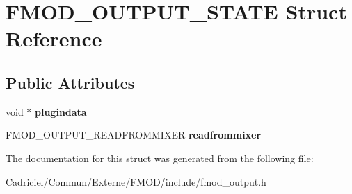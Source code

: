 \hypertarget{struct_f_m_o_d___o_u_t_p_u_t___s_t_a_t_e}{\section{F\-M\-O\-D\-\_\-\-O\-U\-T\-P\-U\-T\-\_\-\-S\-T\-A\-T\-E Struct Reference}
\label{struct_f_m_o_d___o_u_t_p_u_t___s_t_a_t_e}
}
\subsection*{Public Attributes}
\begin{DoxyCompactItemize}
\item 
\hypertarget{struct_f_m_o_d___o_u_t_p_u_t___s_t_a_t_e_a08d52689c8b698c0ea363c7403e8978b}{void $\ast$ {\bfseries plugindata}}\label{struct_f_m_o_d___o_u_t_p_u_t___s_t_a_t_e_a08d52689c8b698c0ea363c7403e8978b}

\item 
\hypertarget{struct_f_m_o_d___o_u_t_p_u_t___s_t_a_t_e_a297cdb7fbba2150340cceecf8d4c9ca1}{F\-M\-O\-D\-\_\-\-O\-U\-T\-P\-U\-T\-\_\-\-R\-E\-A\-D\-F\-R\-O\-M\-M\-I\-X\-E\-R {\bfseries readfrommixer}}\label{struct_f_m_o_d___o_u_t_p_u_t___s_t_a_t_e_a297cdb7fbba2150340cceecf8d4c9ca1}

\end{DoxyCompactItemize}


The documentation for this struct was generated from the following file\-:\begin{DoxyCompactItemize}
\item 
Cadriciel/\-Commun/\-Externe/\-F\-M\-O\-D/include/fmod\-\_\-output.\-h\end{DoxyCompactItemize}
